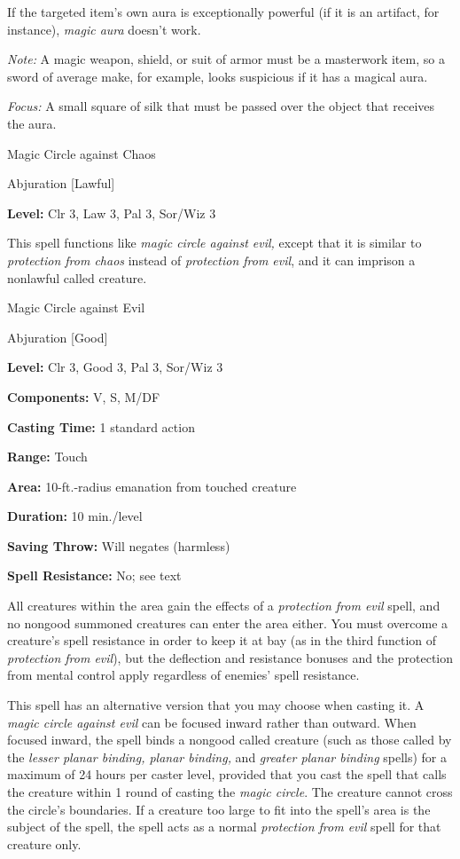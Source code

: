 \documentclass{article}
\begin{document}
If the targeted item's own aura is exceptionally powerful (if it is an artifact, 
for instance), \textit{magic aura }doesn't work.

\textit{Note: }A magic weapon, shield, or suit of armor must be a masterwork item, 
so a sword of average make, for example, looks suspicious if it has a magical aura.

\textit{Focus: }A small square of silk that must be passed over the object that 
receives the aura.

\vspace{12pt}
Magic Circle against Chaos

Abjuration [Lawful]

\textbf{Level:} Clr 3, Law 3, Pal 3, Sor/Wiz 3

This spell functions like \textit{magic circle against evil, }except that it is 
similar to \textit{protection from chaos }instead of \textit{protection from evil}, 
and it can imprison a nonlawful called creature.

\vspace{12pt}
Magic Circle against Evil

Abjuration [Good]

\textbf{Level:} Clr 3, Good 3, Pal 3, Sor/Wiz 3

\textbf{Components:} V, S, M/DF

\textbf{Casting Time:} 1 standard action

\textbf{Range:} Touch

\textbf{Area:} 10-ft.-radius emanation from touched creature

\textbf{Duration:} 10 min./level

\textbf{Saving Throw: }Will negates (harmless)

\textbf{Spell Resistance:} No; see text

All creatures within the area gain the effects of a \textit{protection from evil 
}spell, and no nongood summoned creatures can enter the area either. You must overcome 
a creature's spell resistance in order to keep it at bay (as in the third function 
of \textit{protection from evil}), but the deflection and resistance bonuses and 
the protection from mental control apply regardless of enemies' spell resistance.

This spell has an alternative version that you may choose when casting it. A \textit{magic 
circle against evil }can be focused inward rather than outward. When focused inward, 
the spell binds a nongood called creature (such as those called by the \textit{lesser 
planar binding, planar binding, }and \textit{greater planar binding }spells) for 
a maximum of 24 hours per caster level, provided that you cast the spell that calls 
the creature within 1 round of casting the \textit{magic circle}. The creature 
cannot cross the circle's boundaries. If a creature too large to fit into the spell's 
area is the subject of the spell, the spell acts as a normal \textit{protection 
from evil }spell for that creature only.
\end{document}
